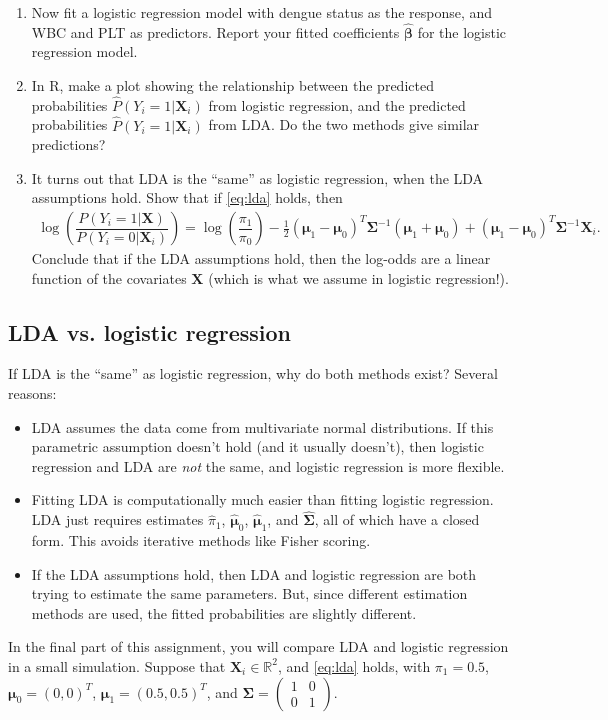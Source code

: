 \documentclass[11pt]{article}
\begin{document}
\begin{enumerate}
\item Now fit a logistic regression model with dengue status as the response, and WBC and PLT as predictors. Report your fitted coefficients $\widehat{\bm{\beta}}$ for the logistic regression model.

\item In R, make a plot showing the relationship between the predicted probabilities $\widehat{P}(Y_i = 1 | \bm{X}_i)$ from logistic regression, and the predicted probabilities $\widehat{P}(Y_i = 1 | \bm{X}_i)$ from LDA. Do the two methods give similar predictions?

\item It turns out that LDA is the ``same'' as logistic regression, when the LDA assumptions hold. Show that if \eqref{eq:lda} holds, then 
\begin{align*}
\log \left( \dfrac{P(Y_i = 1 | \bm{X})}{P(Y_i = 0 | \bm{X}_i)} \right) = \log \left( \dfrac{\pi_1}{\pi_0} \right) - \frac{1}{2} (\bm{\mu}_1 - \bm{\mu}_0)^T \bm{\Sigma}^{-1} (\bm{\mu}_1 + \bm{\mu}_0) + (\bm{\mu}_1 - \bm{\mu}_0)^T \bm{\Sigma}^{-1} \bm{X}_i.
\end{align*}
Conclude that if the LDA assumptions hold, then the log-odds are a linear function of the covariates $\bm{X}$ (which is what we assume in logistic regression!).
\end{enumerate}

\subsection*{LDA vs. logistic regression}
If LDA is the ``same'' as logistic regression, why do both methods exist? Several reasons:
\begin{itemize}
\item LDA assumes the data come from multivariate normal distributions. If this parametric assumption doesn't hold (and it usually doesn't), then logistic regression and LDA are \textit{not} the same, and logistic regression is more flexible.

\item Fitting LDA is computationally much easier than fitting logistic regression. LDA just requires estimates $\widehat{\pi}_1$, $\widehat{\bm{\mu}}_0$, $\widehat{\bm{\mu}}_1$, and $\widehat{\bm{\Sigma}}$, all of which have a closed form. This avoids iterative methods like Fisher scoring.

\item If the LDA assumptions hold, then LDA and logistic regression are both trying to estimate the same parameters. But, since different estimation methods are used, the fitted probabilities are slightly different.
\end{itemize}
In the final part of this assignment, you will compare LDA and logistic regression in a small simulation. Suppose that $\bm{X}_i \in \mathbb{R}^2$, and \eqref{eq:lda} holds, with $\pi_1 = 0.5$, $\bm{\mu}_0 = (0, 0)^T$, $\bm{\mu}_1 = (0.5, 0.5)^T$, and $\bm{\Sigma} = \begin{pmatrix}
1 & 0 \\ 0 & 1
\end{pmatrix}$.
\end{document}
